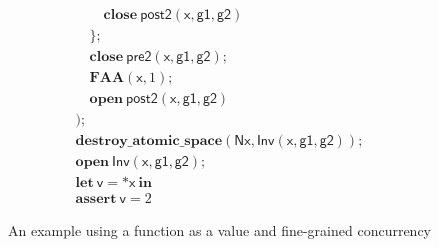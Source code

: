 \documentclass{article}
\begin{document}
\begin{figure}
$$\begin{array}{l}
\quad\quad \mathbf{close}\ \mathsf{post2}(\mathsf{x}, \mathsf{g1}, \mathsf{g2})\\
\quad \};\\
\quad \mathbf{close}\ \mathsf{pre2}(\mathsf{x}, \mathsf{g1}, \mathsf{g2});\\
\quad \mathbf{FAA}(\mathsf{x}, 1);\\
\quad \mathbf{open}\ \mathsf{post2}(\mathsf{x}, \mathsf{g1}, \mathsf{g2})\\
);\\
\mathbf{destroy\_atomic\_space}(\mathsf{Nx}, \mathsf{Inv}(\mathsf{x}, \mathsf{g1}, \mathsf{g2}));\\
\mathbf{open}\ \mathsf{Inv}(\mathsf{x}, \mathsf{g1}, \mathsf{g2});\\
\mathbf{let}\ \mathsf{v} = {*}\mathsf{x}\ \mathbf{in}\\
\mathbf{assert}\ \mathsf{v} = 2
\end{array}$$
\caption{An example using a function as a value and fine-grained concurrency}\label{fig:example}
\end{figure}
\end{document}
